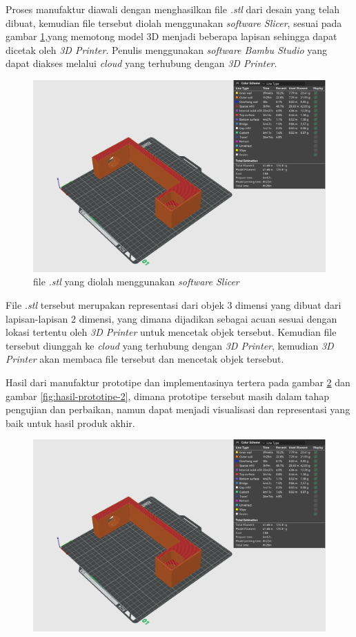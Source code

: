Proses manufaktur diawali dengan menghasilkan file \textit{.stl} dari desain yang telah dibuat, kemudian
file tersebut diolah menggunakan \textit{software Slicer}, sesuai pada gambar \ref{fig:bambu-studio},yang memotong model 3D menjadi beberapa lapisan
sehingga dapat dicetak oleh \textit{3D Printer}. Penulis menggunakan \textit{software Bambu Studio} yang
dapat diakses melalui \textit{cloud} yang terhubung dengan \textit{3D Printer}.

\begin{figure}[H]
  \centering
  \includegraphics[width=0.7\linewidth]{gambar/bambu-studio.png}
  \caption{file \textit{.stl} yang diolah menggunakan \textit{software Slicer}}
  \label{fig:bambu-studio}
\end{figure}

File \textit{.stl} tersebut merupakan representasi dari objek 3 dimensi yang dibuat dari lapisan-lapisan
2 dimensi, yang dimana dijadikan sebagai acuan sesuai dengan lokasi tertentu oleh \textit{3D Printer} 
untuk mencetak objek tersebut. Kemudian file tersebut diunggah ke \textit{cloud} yang terhubung dengan
\textit{3D Printer}, kemudian \textit{3D Printer} akan membaca file tersebut dan mencetak objek tersebut.

Hasil dari manufaktur prototipe dan implementasinya tertera pada gambar \ref{fig:hasil-prototipe-1} 
dan gambar \ref{fig:hasil-prototipe-2}, dimana prototipe tersebut masih dalam tahap pengujian 
dan perbaikan, namun dapat menjadi visualisasi dan representasi yang baik untuk hasil produk akhir.

\begin{figure}[H]
  \centering
  \includegraphics[width=0.7\linewidth]{gambar/bambu-studio.png}
  \caption{}
  \label{fig:hasil-prototipe-1}
\end{figure}

